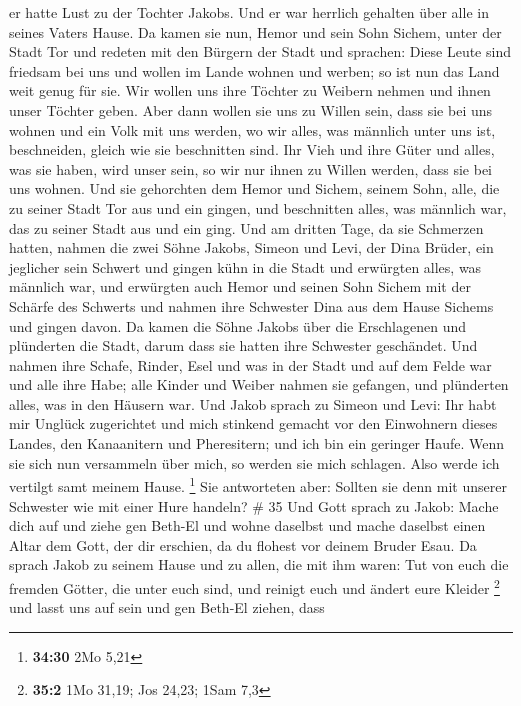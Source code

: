 er hatte Lust zu der Tochter Jakobs. Und er war herrlich gehalten über
alle in seines Vaters Hause.  Da kamen sie nun, Hemor und
sein Sohn Sichem, unter der Stadt Tor und redeten mit den Bürgern der
Stadt und sprachen:  Diese Leute sind friedsam bei uns und
wollen im Lande wohnen und werben; so ist nun das Land weit genug für
sie. Wir wollen uns ihre Töchter zu Weibern nehmen und ihnen unser
Töchter geben.  Aber dann wollen sie uns zu Willen sein,
dass sie bei uns wohnen und ein Volk mit uns werden, wo wir alles, was
männlich unter uns ist, beschneiden, gleich wie sie beschnitten sind.
 Ihr Vieh und ihre Güter und alles, was sie haben, wird
unser sein, so wir nur ihnen zu Willen werden, dass sie bei uns wohnen.
 Und sie gehorchten dem Hemor und Sichem, seinem Sohn,
alle, die zu seiner Stadt Tor aus und ein gingen, und beschnitten alles,
was männlich war, das zu seiner Stadt aus und ein ging. 
Und am dritten Tage, da sie Schmerzen hatten, nahmen die zwei Söhne
Jakobs, Simeon und Levi, der Dina Brüder, ein jeglicher sein Schwert und
gingen kühn in die Stadt und erwürgten alles, was männlich war,
 und erwürgten auch Hemor und seinen Sohn Sichem mit der
Schärfe des Schwerts und nahmen ihre Schwester Dina aus dem Hause
Sichems und gingen davon.  Da kamen die Söhne Jakobs über
die Erschlagenen und plünderten die Stadt, darum dass sie hatten ihre
Schwester geschändet.  Und nahmen ihre Schafe, Rinder, Esel
und was in der Stadt und auf dem Felde war  und alle ihre
Habe; alle Kinder und Weiber nahmen sie gefangen, und plünderten alles,
was in den Häusern war.  Und Jakob sprach zu Simeon und
Levi: Ihr habt mir Unglück zugerichtet und mich stinkend gemacht vor den
Einwohnern dieses Landes, den Kanaanitern und Pheresitern; und ich bin
ein geringer Haufe. Wenn sie sich nun versammeln über mich, so werden
sie mich schlagen. Also werde ich vertilgt samt meinem Hause.
\footnote{\textbf{34:30} 2Mo 5,21}  Sie antworteten aber:
Sollten sie denn mit unserer Schwester wie mit einer Hure handeln? \# 35
 Und Gott sprach zu Jakob: Mache dich auf und ziehe gen
Beth-El und wohne daselbst und mache daselbst einen Altar dem Gott, der
dir erschien, da du flohest vor deinem Bruder Esau.  Da
sprach Jakob zu seinem Hause und zu allen, die mit ihm waren: Tut von
euch die fremden Götter, die unter euch sind, und reinigt euch und
ändert eure Kleider \footnote{\textbf{35:2} 1Mo 31,19; Jos 24,23; 1Sam
  7,3}  und lasst uns auf sein und gen Beth-El ziehen, dass
